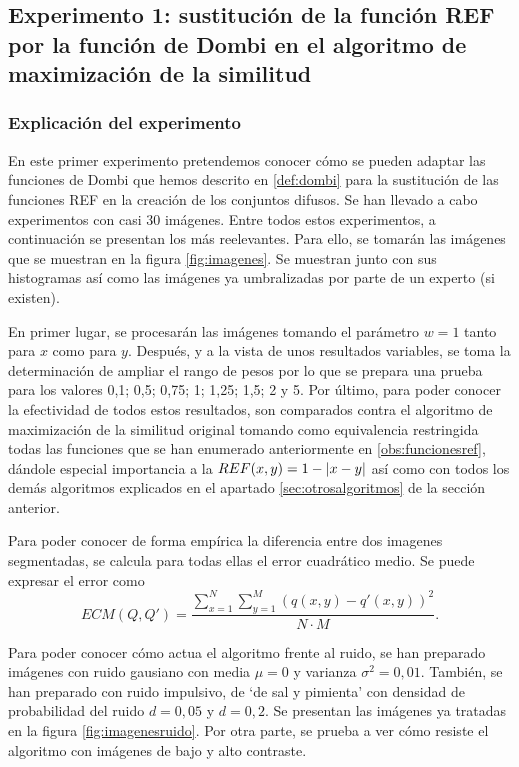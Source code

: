 \documentclass[main]{subfiles}
\begin{document}
\subsection{Experimento 1: sustitución de la función REF por la función de Dombi en el algoritmo de maximización de la similitud}
\subsubsection{Explicación del experimento}
En este primer experimento pretendemos conocer cómo se pueden adaptar las funciones de Dombi que hemos descrito en \ref{def:dombi} para la sustitución de las funciones REF en la creación de los conjuntos difusos. Se han llevado a cabo experimentos con casi 30 imágenes. Entre todos estos experimentos, a continuación se presentan los más reelevantes. Para ello, se tomarán las imágenes que se muestran en la figura \ref{fig:imagenes}. Se muestran junto con sus histogramas así como las imágenes ya umbralizadas por parte de un experto (si existen).

En primer lugar, se procesarán las imágenes tomando el parámetro $w=1$ tanto para $x$ como para $y$. Después, y a la vista de unos resultados variables, se toma la determinación de ampliar el rango de pesos por lo que se prepara una prueba para los valores 0,1; 0,5; 0,75; 1; 1,25; 1,5; 2 y 5. Por último, para poder conocer la efectividad de todos estos resultados, son comparados contra el algoritmo de maximización de la similitud original tomando como equivalencia restringida todas las funciones que se han enumerado anteriormente en \ref{obs:funcionesref}, dándole especial importancia a la \mbox{$REF(x,y)=1-\left\vert x-y\right\vert$} así como con todos los demás algoritmos explicados en el apartado \ref{sec:otrosalgoritmos} de la sección anterior.

Para poder conocer de forma empírica la diferencia entre dos imagenes segmentadas, se calcula para todas ellas el error cuadrático medio. Se puede expresar el error como
$$ECM(Q, Q') = \frac{\sum_{x=1}^N\sum_{y=1}^M \left(q(x,y)-q'(x,y)\right)^2}{N\cdot M}.$$

Para poder conocer cómo actua el algoritmo frente al ruido, se han preparado imágenes con ruido gausiano con media $\mu=0$ y varianza $\sigma^2 = 0,01$. También, se han preparado con ruido impulsivo, de `de sal y pimienta' con densidad de probabilidad del ruido $d=0,05$ y $d=0,2$. Se presentan las imágenes ya tratadas en la figura \ref{fig:imagenesruido}. Por otra parte, se prueba a ver cómo resiste el algoritmo con imágenes de bajo y alto contraste.
\end{document}
